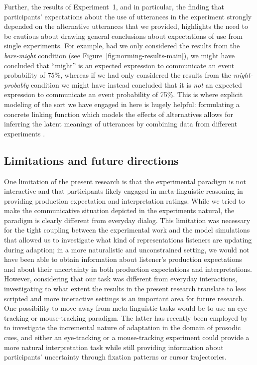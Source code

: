 \documentclass[man, floatsintext]{apa6}
\newcommand{\figref}[1]{Figure~\ref{#1}}
\begin{document}
Further, the results of Experiment~1, and in particular, the finding
that participants' expectations about the use of utterances in the experiment strongly depended on
the alternative utterances that we provided, highlights the need to be cautious about drawing general conclusions about expectations of use from single experiments. For example,
had we only considered the results from the \textit{bare-might} condition (see \figref{fig:norming-results-main}),
we might have concluded that ``might'' is an expected expression to communicate an event probability of 75\%,
whereas if we had only considered the results from the \textit{might-probably} condition we might have instead concluded that it is \emph{not} an expected expression to communicate an event probability of 75\%.
This is where explicit modeling of the sort we have engaged in here is hugely helpful: formulating a concrete linking function which models the effects of 
alternatives allows for inferring the latent meanings of utterances by combining data from different experiments \parencite[see also][for similar approaches]{Franke2014,Peloquin2016}.

\subsection{Limitations and future directions}

One limitation of the present research is that the experimental paradigm is not interactive and that participants likely engaged in meta-linguistic reasoning in providing production expectation and interpretation ratings. While we tried to make the communicative situation depicted in the experiments natural,
the paradigm is clearly different from everyday dialog. This limitation was necessary for the tight coupling between the experimental work
and the model simulations that allowed us to investigate what kind of representations listeners are updating during adaption; in a more
naturalistic and unconstrained setting, we would not have been able to obtain information about listener's production expectations and about their
uncertainty in both production expectations and interpretations. However, considering that our task was different from everyday interactions, investigating
to what extent the results in the present research translate to less scripted and more interactive settings is an important area for future research. 
One possibility to move away from meta-linguistic tasks would be to use an eye-tracking or mouse-tracking paradigm. The latter has recently been
employed by \textcite{Roettger2019} to investigate the incremental nature of adaptation in the domain of  prosodic cues, and either an eye-tracking or a mouse-tracking experiment could
provide a more natural interpretation task while still providing information about participants' uncertainty through fixation patterns or cursor trajectories.
\end{document}
